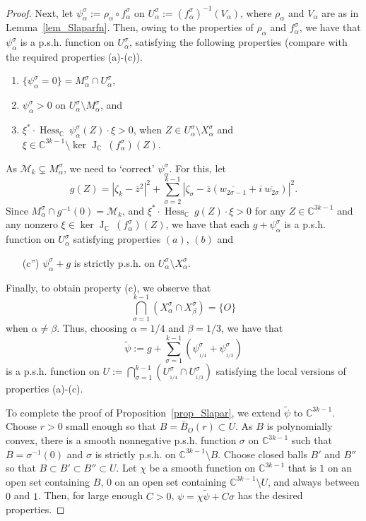 \documentclass[10pt]{amsart}
\numberwithin{equation}{section}
\theoremstyle{definition}
\theoremstyle{definition}
\theoremstyle{plain}
\newcommand{\bes} {\begin{equation*}}
\newcommand{\ees} {\end{equation*}}
\newcommand{\be} {\begin{equation}}
\newcommand{\ee} {\end{equation}}
\newcommand{\bc}{\mathcal{M}}
\newcommand{\zbar}{\overline{z}}
\newcommand{\Chess}{\operatorname{Hess}_{ \C}\!\:}
\newcommand{\JacC}{\operatorname{J}_\C\!\:}
\newcommand{\wt}{\widetilde}
\newcommand{\C} {\mathbb{C}}
\begin{document}
\begin{proof}
Next, let $\psi_\alpha^\sigma:=\rho_\alpha\circ f_\alpha^\sigma$ on $U_\alpha^\sigma:=(f_\alpha^\sigma)^{-1}(V_\alpha)$, where $\rho_\alpha$ and $V_\alpha$ are as in Lemma~\ref{lem_Slaparfn}. Then, owing to the properties of $\rho_\alpha$ and $f_\alpha^\sigma$, we have that $\psi_\alpha^\sigma$ is a p.s.h. function on $U_\alpha^\sigma$, satisfying the following properties (compare with the required properties (a)-(c)).
\renewcommand{\theenumi}{\alph{enumi}'}
	\begin{enumerate}
		\item $\{\psi_\alpha^\sigma=0\}=M_\alpha^\sigma\cap U_\alpha^\sigma$,
		\item $\psi_\alpha^\sigma>0$ on 
				$U_\alpha^\sigma\setminus M_\alpha^\sigma$, and 
		\item $ \xi^* \cdot 	\Chess\psi_\alpha^\sigma(Z) \cdot \xi>0$,
				 when $Z\in U_\alpha^\sigma\setminus X_\alpha^\sigma$
				 and $\xi\in\C^{3k-1}\setminus \ker\JacC(f_\alpha^\sigma)(Z)$.
	\end{enumerate} 
As $\bc_k\subsetneq M_\alpha^\sigma$, we need to `correct' $\psi_\alpha^\sigma$. For this, let 
	\bes
		g(Z)=|\zeta_k-\zbar^2|^2
			+\sum_{\sigma=2}^{k-1}|\zeta_\sigma
				-\zbar(\overline{w_{2\sigma-1}}+i\:\overline{w_{2\sigma}})|^2. 
	\ees
Since $M_\alpha^\sigma\cap g^{-1}(0)=\bc_k$, and $\xi^*\cdot \Chess g(Z)\cdot\xi>0$ for any $Z\in\C^{3k-1}$ and any nonzero $\xi\in \ker\JacC(f_\alpha^\sigma)(Z)$, we have that each $g+\psi_\alpha^\sigma$ is a p.s.h. function on $U_\alpha^\sigma$ satisfying properties $(a)$, $(b)$ and 
	\begin{itemize}
		\item [(c'')] $\psi_\alpha^\sigma+g$ is strictly p.s.h. on 
							$U_\alpha^\sigma\setminus X_\alpha^\sigma$.
	\end{itemize}
Finally, to obtain property (c), we observe that
 	\bes	
		\bigcap _{\sigma=1}^{k-1}\left(X_\alpha^{\sigma}
			\cap X_\beta^{\sigma}\right) 
			=\{O\}
	\ees
when $\alpha\neq\beta$. Thus, choosing $\alpha=1/4$ and $\beta=1/3$, we have that
		\be\label{eq_defpsi}
			\wt\psi:=g+\sum_{\sigma=1}^{k-1}\left(\psi_{_{1/4}}^\sigma
				+\psi_{_{1/3}}^\sigma\right)
		\ee
is a p.s.h. function on $U:=\bigcap _{\sigma=1}^{k-1}\left(U_{_{1/4}}^{\sigma}\cap U_{_{1/3}}^{\sigma}\right)$ satisfying the local versions of properties (a)-(c).

To complete the proof of Proposition~\ref{prop_Slapar}, we extend $\wt\psi$ to $\C^{3k-1}$. Choose $r>0$ small enough so that $B=\bar B_O(r)\subset U$.  As $B$ is polynomially convex, there is a smooth nonnegative p.s.h. function $\sigma$ on $\C^{3k-1}$ such that $B=\sigma^{-1}(0)$ and $\sigma$ is strictly p.s.h. on $\C^{3k-1}\setminus B$. Choose closed balls $B'$ and $B''$ so that $B\subset B'\subset B'' \subset U$. Let $\chi$ be a smooth function on $\C^{3k-1}$ that is $1$ on an open set containing $B$, $0$ on an open set containing $\C^{3k-1}\setminus U$, and always between $0$ and $1$. Then, for large enough $C>0$, $\psi=\chi\wt\psi+C\sigma$ has the desired properties.
\end{proof}
\end{document}
